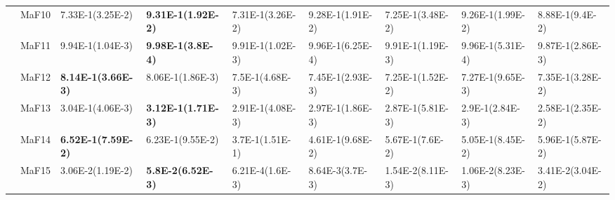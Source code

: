 \documentclass[]{article}
\begin{document}
\begin{landscape}
\begin{table}
\begin{footnotesize}
\begin{tabular}{|l|l|l|l|l|l|l|l|l|}
 & MaF10 & 7.33E-1(3.25E-2) & \cellcolor{gray95} {\bf 9.31E-1(1.92E-2)} & 7.31E-1(3.26E-2) & \cellcolor{gray95} 9.28E-1(1.91E-2) & 7.25E-1(3.48E-2) & \cellcolor{gray95} 9.26E-1(1.99E-2) & \cellcolor{gray95} 8.88E-1(9.4E-2)\\
 & MaF11 & 9.94E-1(1.04E-3) & \cellcolor{gray95} {\bf 9.98E-1(3.8E-4)} & 9.91E-1(1.02E-3) & \cellcolor{gray95} 9.96E-1(6.25E-4) & 9.91E-1(1.19E-3) & \cellcolor{gray95} 9.96E-1(5.31E-4) & 9.87E-1(2.86E-3)\\
 & MaF12 & \cellcolor{gray95} {\bf 8.14E-1(3.66E-3)} & \cellcolor{gray95} 8.06E-1(1.86E-3) & 7.5E-1(4.68E-3) & 7.45E-1(2.93E-3) & 7.25E-1(1.52E-2) & 7.27E-1(9.65E-3) & 7.35E-1(3.28E-2)\\
 & MaF13 & \cellcolor{gray95} 3.04E-1(4.06E-3) & \cellcolor{gray95} {\bf 3.12E-1(1.71E-3)} & 2.91E-1(4.08E-3) & 2.97E-1(1.86E-3) & 2.87E-1(5.81E-3) & 2.9E-1(2.84E-3) & 2.58E-1(2.35E-2)\\
 & MaF14 & \cellcolor{gray95} {\bf 6.52E-1(7.59E-2)} & \cellcolor{gray95} 6.23E-1(9.55E-2) & 3.7E-1(1.51E-1) & 4.61E-1(9.68E-2) & 5.67E-1(7.6E-2) & 5.05E-1(8.45E-2) & \cellcolor{gray95} 5.96E-1(5.87E-2)\\
 & MaF15 & \cellcolor{gray95} 3.06E-2(1.19E-2) & \cellcolor{gray95} {\bf 5.8E-2(6.52E-3)} & 6.21E-4(1.6E-3) & 8.64E-3(3.7E-3) & 1.54E-2(8.11E-3) & 1.06E-2(8.23E-3) & 3.41E-2(3.04E-2)\\
\hline


\end{tabular}
\end{footnotesize}
\end{table}
\end{landscape}
\end{document}
